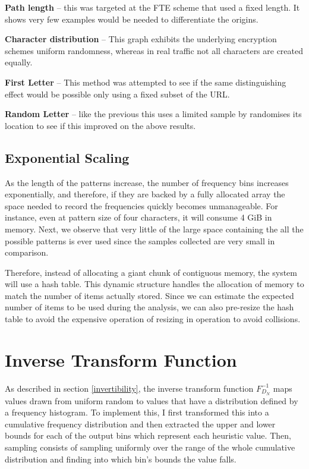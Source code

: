 \documentclass[ %
                    author={Samuel Russell},
                supervisor={Prof. Bogdan Warinschi},
                    degree={MEng},
                     title={Innocuous Ciphertexts},
                  subtitle={The DE-CENSOR Scheme},
                      type={Research},
                      year={2018} ]{dissertation}
\begin{document}
\textbf{Path length} -- this was targeted at the FTE scheme that used a fixed length. It shows very few examples would be needed to differentiate the origins.

\textbf{Character distribution} -- This graph exhibits the underlying encryption schemes uniform randomness, whereas in real traffic not all characters are created equally.

\textbf{First Letter} -- This method was attempted to see if the same distinguishing effect would be possible only using a fixed subset of the URL.

\textbf{Random Letter} -- like the previous this uses a limited sample by randomises its location to see if this improved on the above results.

\subsection{Exponential Scaling}

As the length of the patterns increase, the number of frequency bins increases exponentially, and therefore, if they are backed by a fully allocated array the space needed to record the frequencies quickly becomes unmanageable.
For instance, even at pattern size of four characters, it will consume 4 GiB in memory.
Next, we observe that very little of the large space containing the all the possible patterns is ever used since the samples collected are very small in comparison.

Therefore, instead of allocating a giant chunk of contiguous memory, the system will use a hash table.
This dynamic structure handles the allocation of memory to match the number of items actually stored.
Since we can estimate the expected number of items to be used during the analysis, we can also pre-resize the hash table to avoid the expensive operation of resizing in operation to avoid collisions.

\section{Inverse Transform Function}

As described in section \ref{invertibility}, the inverse transform function $F^{-1}_{D_N}$ maps values drawn from uniform random to values that have a distribution defined by a frequency histogram.
To implement this, I first transformed this into a cumulative frequency distribution and then extracted the upper and lower bounds for each of the output bins which represent each heuristic value.
Then, sampling consists of sampling uniformly over the range of the whole cumulative distribution and finding into which bin's bounds the value falls.
\end{document}
